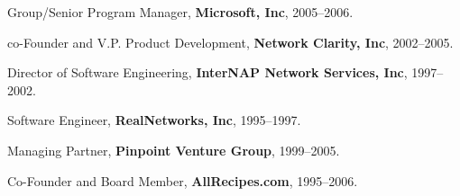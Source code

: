 \documentclass[11pt,article,oneside]{memoir}
\begin{document}
\ind Group/Senior Program Manager, \textbf{Microsoft, Inc}, 2005--2006.

\ind co-Founder and V.P. Product Development, \textbf{Network Clarity, Inc}, 2002--2005.

\ind Director of Software Engineering, \textbf{InterNAP Network Services, Inc}, 1997--2002.

\ind Software Engineer, \textbf{RealNetworks, Inc}, 1995--1997.

\ind Managing Partner, \textbf{Pinpoint Venture Group}, 1999--2005.

\ind Co-Founder and Board Member, \textbf{AllRecipes.com}, 1995--2006.

\medskip

 

\begin{refsection}
\nocite{*}
\printbibliography[type=article,heading=subbibliography,title={Journal Articles}]
\end{refsection}

\begin{refsection}
\nocite{*}
\printbibliography[type=incollection,heading=subbibliography,title={Book Chapters and Edited Volumes}]
\end{refsection}

\begin{refsection}
\nocite{*}
\printbibliography[type=inproceedings,heading=subbibliography,title={Invited Lectures and Conference Papers}]
\end{refsection}



\medskip
\end{document}

